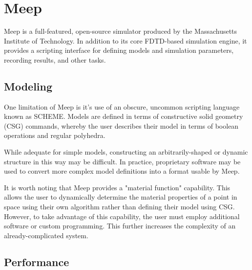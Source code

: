 \chapter{Meep} \label{ch:meep}

Meep\cite{OskooiRo10} is a full-featured, open-source simulator produced by the Massachusetts Institute of Technology. In addition to its core FDTD-based simulation engine, it provides a scripting interface for defining models and simulation parameters, recording results, and other tasks.  





\section{Modeling}

\iffalse

While I may agree, you need to keep they hyperbole and sarcasm out.  You should re-write this section to state what Meep is, how it is used, and how you made use of some of it's features.  You can also look up how many citations it has (on their website) to showcase that it's widely used and trusted making it a valid point of comparison 
\fi

One limitation of Meep is it's use of an obscure, uncommon scripting language known as SCHEME. Models are defined in terms of constructive solid geometry (CSG) commands, whereby the user describes their model in terms of boolean operations and regular polyhedra. 

While adequate for simple models, constructing an arbitrarily-shaped or dynamic structure in this way may be difficult. In practice, proprietary software may be used to convert more complex model definitions into a format usable by Meep.

It is worth noting that Meep provides a "material function" capability. This allows the user to dynamically determine the material properties of a point in space using their own algorithm rather than defining their model using CSG. However, to take advantage of this capability, the user must employ additional software or custom programming. This further increases the complexity of an already-complicated system. 



\section{Performance}

